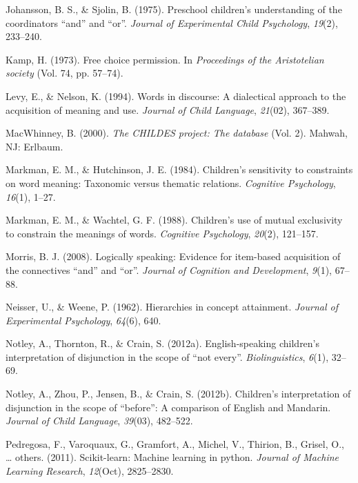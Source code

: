 \documentclass[,man,floatsintext]{apa6}
\begin{document}
\leavevmode\hypertarget{ref-johansson1975preschool}{}%
Johansson, B. S., \& Sjolin, B. (1975). Preschool children's understanding of the coordinators ``and'' and ``or''. \emph{Journal of Experimental Child Psychology}, \emph{19}(2), 233--240.

\leavevmode\hypertarget{ref-kamp1973free}{}%
Kamp, H. (1973). Free choice permission. In \emph{Proceedings of the Aristotelian society} (Vol. 74, pp. 57--74).

\leavevmode\hypertarget{ref-levy1994words}{}%
Levy, E., \& Nelson, K. (1994). Words in discourse: A dialectical approach to the acquisition of meaning and use. \emph{Journal of Child Language}, \emph{21}(02), 367--389.

\leavevmode\hypertarget{ref-macwhinney2000childes}{}%
MacWhinney, B. (2000). \emph{The CHILDES project: The database} (Vol. 2). Mahwah, NJ: Erlbaum.

\leavevmode\hypertarget{ref-markman1984children}{}%
Markman, E. M., \& Hutchinson, J. E. (1984). Children's sensitivity to constraints on word meaning: Taxonomic versus thematic relations. \emph{Cognitive Psychology}, \emph{16}(1), 1--27.

\leavevmode\hypertarget{ref-markman1988children}{}%
Markman, E. M., \& Wachtel, G. F. (1988). Children's use of mutual exclusivity to constrain the meanings of words. \emph{Cognitive Psychology}, \emph{20}(2), 121--157.

\leavevmode\hypertarget{ref-morris2008logically}{}%
Morris, B. J. (2008). Logically speaking: Evidence for item-based acquisition of the connectives ``and'' and ``or''. \emph{Journal of Cognition and Development}, \emph{9}(1), 67--88.

\leavevmode\hypertarget{ref-neisser1962hierarchies}{}%
Neisser, U., \& Weene, P. (1962). Hierarchies in concept attainment. \emph{Journal of Experimental Psychology}, \emph{64}(6), 640.

\leavevmode\hypertarget{ref-notley2012notevery}{}%
Notley, A., Thornton, R., \& Crain, S. (2012a). English-speaking children's interpretation of disjunction in the scope of ``not every''. \emph{Biolinguistics}, \emph{6}(1), 32--69.

\leavevmode\hypertarget{ref-notley2012children}{}%
Notley, A., Zhou, P., Jensen, B., \& Crain, S. (2012b). Children's interpretation of disjunction in the scope of ``before'': A comparison of English and Mandarin. \emph{Journal of Child Language}, \emph{39}(03), 482--522.

\leavevmode\hypertarget{ref-pedregosa2011scikit}{}%
Pedregosa, F., Varoquaux, G., Gramfort, A., Michel, V., Thirion, B., Grisel, O., \ldots{} others. (2011). Scikit-learn: Machine learning in python. \emph{Journal of Machine Learning Research}, \emph{12}(Oct), 2825--2830.
\end{document}
